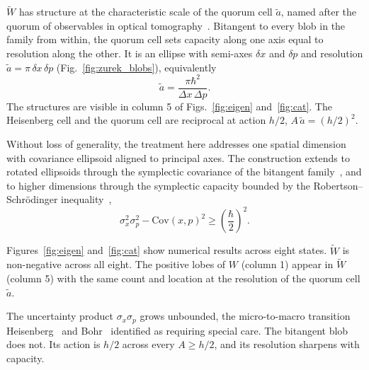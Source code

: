 \documentclass[aps,prl,reprint,amsmath,amssymb,floatfix,nofootinbib]{revtex4-2}
\begin{document}
$\widetilde W$ has structure at the characteristic scale of the quorum cell $\tilde a$, named after the quorum of observables in optical tomography~\cite{darianomacconeparis2001}. Bitangent to every blob in the family from within, the quorum cell sets capacity along one axis equal to resolution along the other. It is an ellipse with semi-axes $\delta x$ and $\delta p$ and resolution $\tilde a = \pi\,\delta x\,\delta p$ (Fig.~\ref{fig:zurek_blobs}), equivalently
\begin{equation}
\tilde a = \frac{\pi\hbar^2}{\Delta x\,\Delta p}.
\label{eq:tildea}
\end{equation}
The structures are visible in column 5 of Figs.~\ref{fig:eigen} and~\ref{fig:cat}. The Heisenberg cell and the quorum cell are reciprocal at action $h/2$, $A\,\tilde a = (h/2)^2$.

Without loss of generality, the treatment here addresses one spatial dimension with covariance ellipsoid aligned to principal axes. The construction extends to rotated ellipsoids through the symplectic covariance of the bitangent family~\cite{cordero2018}, and to higher dimensions through the symplectic capacity bounded by the Robertson--Schr\"odinger inequality~\cite{robertson1929,schrodinger1930,degosson2013qblobs},
\begin{equation}
\sigma_x^2 \sigma_p^2 - \mathrm{Cov}(x,p)^2 \ge \left(\frac{\hbar}{2}\right)^2.
\label{eq:rs}
\end{equation}

Figures~\ref{fig:eigen} and~\ref{fig:cat} show numerical results across eight states. $\widetilde W$ is non-negative across all eight. The positive lobes of $W$ (column 1) appear in $\widetilde W$ (column 5) with the same count and location at the resolution of the quorum cell $\tilde a$.


The uncertainty product $\sigma_x \sigma_p$ grows unbounded, the micro-to-macro transition Heisenberg~\cite{heisenberg1927} and Bohr~\cite{bohr1928} identified as requiring special care. The bitangent blob does not. Its action is $h/2$ across every $A \ge h/2$, and its resolution sharpens with capacity.
\end{document}
